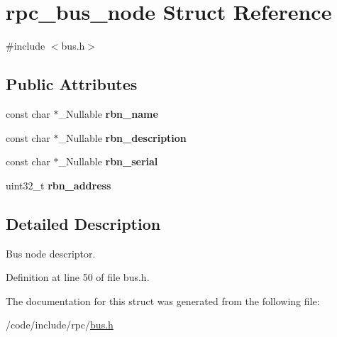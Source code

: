 \hypertarget{structrpc__bus__node}{}\section{rpc\+\_\+bus\+\_\+node Struct Reference}
\label{structrpc__bus__node}


{\ttfamily \#include $<$bus.\+h$>$}

\subsection*{Public Attributes}
\begin{DoxyCompactItemize}
\item 
\mbox{\label{structrpc__bus__node_a9afbf9a155ae01c1c47dc210a8334022}} 
const char $\ast$\+\_\+\+Nullable {\bfseries rbn\+\_\+name}
\item 
\mbox{\label{structrpc__bus__node_af5d23beee7c50520e7235f0c922fafb1}} 
const char $\ast$\+\_\+\+Nullable {\bfseries rbn\+\_\+description}
\item 
\mbox{\label{structrpc__bus__node_a885b358a61a0b459d86d7c534be6ef0f}} 
const char $\ast$\+\_\+\+Nullable {\bfseries rbn\+\_\+serial}
\item 
\mbox{\label{structrpc__bus__node_a624e2a0be665938924ab2f815afb669e}} 
uint32\+\_\+t {\bfseries rbn\+\_\+address}
\end{DoxyCompactItemize}


\subsection{Detailed Description}
Bus node descriptor. 

Definition at line 50 of file bus.\+h.



The documentation for this struct was generated from the following file\+:\begin{DoxyCompactItemize}
\item 
/code/include/rpc/\hyperlink{bus_8h}{bus.\+h}\end{DoxyCompactItemize}
